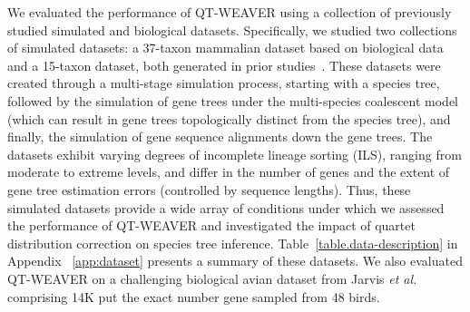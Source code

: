 \documentclass[10pt,a4paper]{article}
\newcommand{\addb}[1]{{\color{red} #1}}
\begin{document}
We evaluated the performance of QT-WEAVER using a collection of previously studied simulated and biological datasets. Specifically, we studied two collections of simulated datasets: a 37-taxon mammalian dataset based on biological data~\cite{song-mammal} and a 15-taxon dataset, both generated in prior studies~\cite{statistical-binning,bayzid2015weighted}. These datasets were created through a multi-stage simulation process, starting with a species tree, followed by the simulation of gene trees under the multi-species coalescent model (which can result in gene trees topologically distinct from the species tree), and finally, the simulation of gene sequence alignments down the gene trees. The datasets exhibit varying degrees of incomplete lineage sorting (ILS), ranging from moderate to extreme levels, and differ in the number of genes and the extent of gene tree estimation errors (controlled by sequence lengths). Thus, these simulated datasets provide a wide array of conditions under which we assessed the performance of QT-WEAVER and investigated the impact of quartet distribution correction on species tree inference.
Table~\ref{table.data-description} in Appendix ~\ref{app:dataset} presents a summary of these datasets. 
We also evaluated QT-WEAVER on a challenging biological avian dataset from Jarvis \textit{et al.}~\cite{jarvis2014} comprising 14K \addb{put the exact number} gene sampled from 48 birds.


\end{document}
